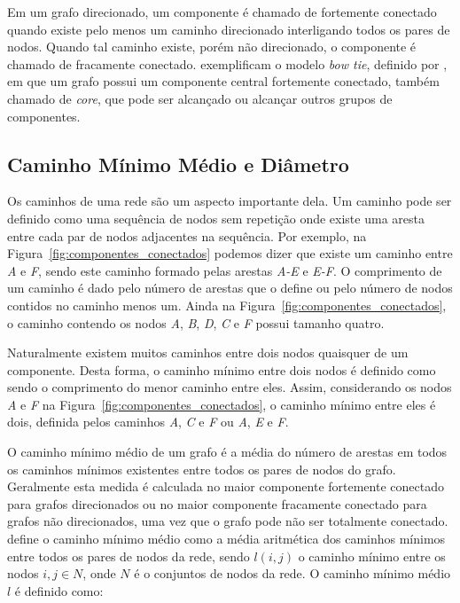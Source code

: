 Em um grafo direcionado, um componente é chamado de fortemente conectado quando existe pelo menos um caminho 
direcionado interligando todos os pares de nodos. Quando tal caminho existe, porém não direcionado, o componente 
é chamado de fracamente conectado. \cite{Benevenuto2012} exemplificam o modelo \textit{bow tie}, definido 
por \cite{Broder2000}, em que um grafo possui um componente central fortemente conectado, 
também chamado de \textit{core}, que pode ser alcançado ou alcançar outros grupos de componentes.



\subsection{Caminho Mínimo Médio e Diâmetro}

Os caminhos de uma rede são um aspecto importante dela. Um caminho pode ser definido como uma sequência de nodos sem repetição
onde existe uma aresta entre cada par de nodos adjacentes na sequência. Por exemplo, na Figura~\ref{fig:componentes_conectados}
podemos dizer que existe um caminho entre \textit{A} e \textit{F}, sendo este caminho formado pelas arestas \textit{A-E} e 
\textit{E-F}. O comprimento de um caminho é dado pelo número de arestas que o define ou pelo número de nodos contidos no caminho
menos um. Ainda na Figura~\ref{fig:componentes_conectados}, o caminho contendo os nodos \textit{A}, \textit{B}, \textit{D}, \textit{C} e \textit{F} possui 
tamanho quatro.

Naturalmente existem muitos caminhos entre dois nodos quaisquer de um componente. Desta forma, o caminho mínimo entre
dois nodos é definido como sendo o comprimento do menor caminho entre eles. Assim, considerando os nodos  
\textit{A} e \textit{F} na Figura~\ref{fig:componentes_conectados}, o caminho mínimo entre eles é dois, definida pelos caminhos 
\textit{A}, \textit{C} e \textit{F} ou \textit{A}, \textit{E} e \textit{F}. 

O caminho mínimo médio de um grafo é a média do número de arestas em todos os caminhos mínimos existentes entre todos os pares 
de nodos do grafo. Geralmente esta medida é calculada no maior componente fortemente conectado para grafos direcionados ou no maior 
componente fracamente conectado para grafos não direcionados, uma vez que o grafo pode não ser totalmente conectado. \cite{Figueiredo2011} define 
o caminho mínimo médio como a média aritmética dos caminhos mínimos entre todos os pares de nodos da rede, sendo $l(i,j)$ o caminho mínimo entre os nodos
$i,j \in N$, onde $N$ é o conjuntos de nodos da rede. O caminho mínimo médio $\textit{\=l}$ é definido como:

